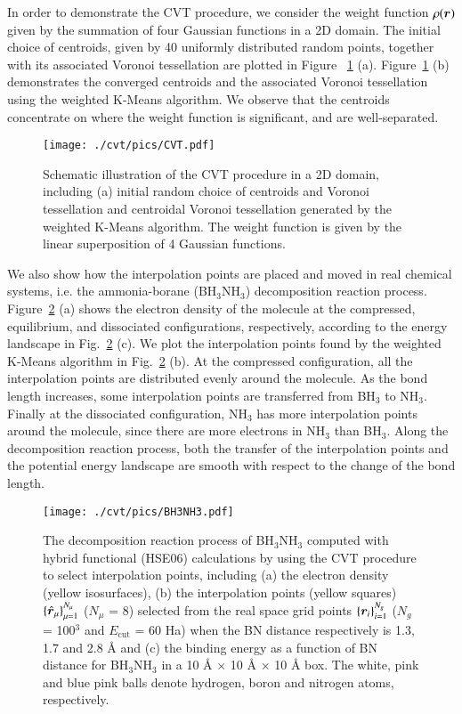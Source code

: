In order to demonstrate the CVT procedure, we consider the weight function $\rho
(\bm{r})$ given by the summation of four Gaussian functions in a 2D domain. The
initial choice of centroids, given by 40 uniformly distributed random points,
together with its associated Voronoi tessellation are plotted in Figure~
\ref{fig:CVT} (a). Figure~\ref{fig:CVT} (b) demonstrates the converged centroids
and the associated Voronoi tessellation using the weighted K-Means algorithm. We
observe that the centroids concentrate on where the weight function is
significant, and are well-separated.

\begin{figure}[htbp]
  \begin{center}
    \texttt{[image: ./cvt/pics/CVT.pdf]}
  \end{center}
  \caption{Schematic illustration of the CVT procedure in a 2D domain, including
  (a) initial random choice of centroids and Voronoi tessellation and centroidal
  Voronoi tessellation generated by the weighted K-Means algorithm. The weight
  function is given by  the linear superposition of 4 Gaussian functions.}
  \label{fig:CVT}
\end{figure}

We also show how the interpolation points are placed and moved in real chemical
systems, i.e. the ammonia-borane (BH$_3$NH$_3$) decomposition reaction process.
Figure~\ref{fig:BH3NH3} (a) shows the electron density of the molecule at the
compressed, equilibrium, and dissociated configurations, respectively, according
to the energy landscape in Fig.~\ref{fig:BH3NH3} (c). We plot the interpolation
points found by the weighted K-Means algorithm in Fig.~\ref{fig:BH3NH3} (b). At
the compressed configuration, all the interpolation points are distributed
evenly around the molecule. As the bond length increases, some interpolation
points are transferred from BH$_3$ to NH$_3$. Finally at the dissociated
configuration, NH$_3$ has more interpolation points around the molecule, since
there are more electrons in NH$_3$ than BH$_3$. Along the decomposition reaction
process, both the transfer of the interpolation points and the potential energy
landscape are smooth with respect to the change of the bond length.


\begin{figure}[htbp]
  \begin{center}
    \texttt{[image: ./cvt/pics/BH3NH3.pdf]}
  \end{center}
  \caption{The decomposition reaction process of BH$_3$NH$_3$ computed with
  hybrid functional (HSE06) calculations by using the CVT procedure to select
  interpolation points, including (a) the electron density (yellow isosurfaces),
  (b) the interpolation points (yellow squares) $\{\smash{\hat{\bm{r}}}_\mu\}_{\mu=1}^{N_
  {\mu}}$ ($N_{\mu}$ = 8) selected from the real space grid points $\{\bm{r}_{i}\}_
  {i=1}^{N_{g}}$ ($N_{g}$ = 100$^3$ and $E_{\text{cut}}$ = 60 Ha) when the BN
  distance respectively is 1.3, 1.7 and 2.8 {\AA} and (c) the binding energy as
  a function of BN distance for BH$_3$NH$_3$ in a 10 {\AA} $\times$ 10 {\AA}
  $\times$ 10 {\AA} box. The white, pink and blue pink balls denote hydrogen,
  boron and nitrogen atoms, respectively.}
  \label{fig:BH3NH3}
\end{figure}